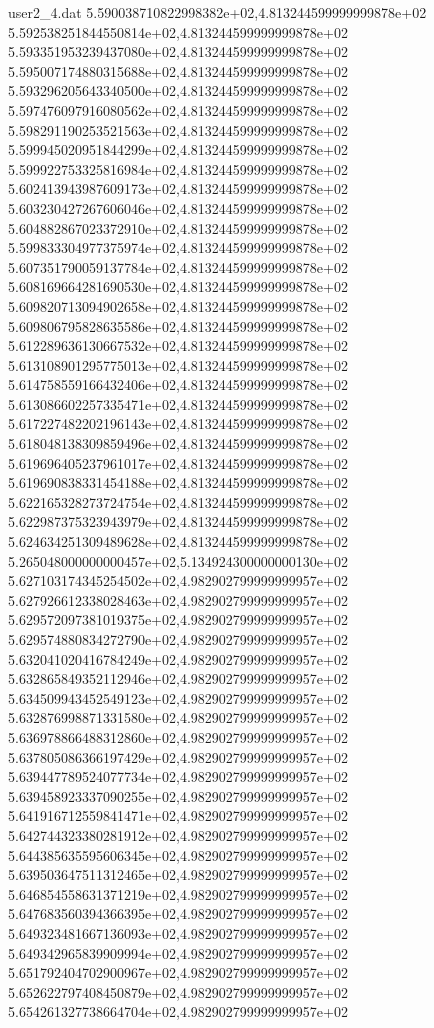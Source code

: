 \begin{filecontents}{user2_4.dat}
5.590038710822998382e+02,4.813244599999999878e+02
5.592538251844550814e+02,4.813244599999999878e+02
5.593351953239437080e+02,4.813244599999999878e+02
5.595007174880315688e+02,4.813244599999999878e+02
5.593296205643340500e+02,4.813244599999999878e+02
5.597476097916080562e+02,4.813244599999999878e+02
5.598291190253521563e+02,4.813244599999999878e+02
5.599945020951844299e+02,4.813244599999999878e+02
5.599922753325816984e+02,4.813244599999999878e+02
5.602413943987609173e+02,4.813244599999999878e+02
5.603230427267606046e+02,4.813244599999999878e+02
5.604882867023372910e+02,4.813244599999999878e+02
5.599833304977375974e+02,4.813244599999999878e+02
5.607351790059137784e+02,4.813244599999999878e+02
5.608169664281690530e+02,4.813244599999999878e+02
5.609820713094902658e+02,4.813244599999999878e+02
5.609806795828635586e+02,4.813244599999999878e+02
5.612289636130667532e+02,4.813244599999999878e+02
5.613108901295775013e+02,4.813244599999999878e+02
5.614758559166432406e+02,4.813244599999999878e+02
5.613086602257335471e+02,4.813244599999999878e+02
5.617227482202196143e+02,4.813244599999999878e+02
5.618048138309859496e+02,4.813244599999999878e+02
5.619696405237961017e+02,4.813244599999999878e+02
5.619690838331454188e+02,4.813244599999999878e+02
5.622165328273724754e+02,4.813244599999999878e+02
5.622987375323943979e+02,4.813244599999999878e+02
5.624634251309489628e+02,4.813244599999999878e+02
5.265048000000000457e+02,5.134924300000000130e+02
5.627103174345254502e+02,4.982902799999999957e+02
5.627926612338028463e+02,4.982902799999999957e+02
5.629572097381019375e+02,4.982902799999999957e+02
5.629574880834272790e+02,4.982902799999999957e+02
5.632041020416784249e+02,4.982902799999999957e+02
5.632865849352112946e+02,4.982902799999999957e+02
5.634509943452549123e+02,4.982902799999999957e+02
5.632876998871331580e+02,4.982902799999999957e+02
5.636978866488312860e+02,4.982902799999999957e+02
5.637805086366197429e+02,4.982902799999999957e+02
5.639447789524077734e+02,4.982902799999999957e+02
5.639458923337090255e+02,4.982902799999999957e+02
5.641916712559841471e+02,4.982902799999999957e+02
5.642744323380281912e+02,4.982902799999999957e+02
5.644385635595606345e+02,4.982902799999999957e+02
5.639503647511312465e+02,4.982902799999999957e+02
5.646854558631371219e+02,4.982902799999999957e+02
5.647683560394366395e+02,4.982902799999999957e+02
5.649323481667136093e+02,4.982902799999999957e+02
5.649342965839909994e+02,4.982902799999999957e+02
5.651792404702900967e+02,4.982902799999999957e+02
5.652622797408450879e+02,4.982902799999999957e+02
5.654261327738664704e+02,4.982902799999999957e+02

\end{filecontents}
